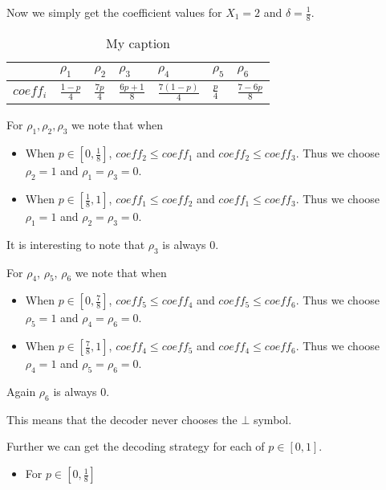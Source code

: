 \documentclass{article}
\begin{document}
Now we simply get the coefficient values for $X_1 = 2$ and $\delta = \frac{1}{8}$.
\begin{table}[H]
\centering
\caption{My caption}
\label{my-label}
\begin{tabular}{|l|l|l|l|l|l|l|}
\hline
          & $\rho_1$        & $\rho_2$       & $\rho_3$           & $\rho_4$           & $\rho_5$      & $\rho_6$           \\ \hline
$coeff_i$ & $\frac{1-p}{4}$ & $\frac{7p}{4}$ & $\frac{6p + 1}{8}$ & $\frac{7(1-p)}{4}$ & $\frac{p}{4}$ & $\frac{7 - 6p}{8}$ \\ \hline
\end{tabular}
\end{table}
For $\rho_1, \rho_2, \rho_3$ we note that when
\begin{itemize}
\item When $p \in [0,\frac{1}{8}]$, $coeff_2 \le coeff_1$ and $coeff_2 \le coeff_3$. Thus we choose $\rho_2=1$ and $\rho_1 = \rho_3 = 0$.
\item When $p \in [\frac{1}{8}, 1]$, $coeff_1 \le coeff_2$ and $coeff_1 \le coeff_3$. Thus we choose $\rho_1 = 1$ and $\rho_2 = \rho_3 = 0$.
\end{itemize}
It is interesting to note that $\rho_3$ is always 0.

For $\rho_4$, $\rho_5$, $\rho_6$ we note that when
\begin{itemize}
\item When $p \in [0, \frac{7}{8}]$, $coeff_5 \le coeff_4$ and $coeff_5 \le coeff_6$. Thus we choose $\rho_5 = 1$ and $\rho_4 = \rho_6 = 0$.
\item When $p \in [\frac{7}{8}, 1]$, $coeff_4 \le coeff_5$ and $coeff_4 \le coeff_6$. Thus we choose $\rho_4 = 1$ and $\rho_5 = \rho_6 = 0$.
\end{itemize}
Again $\rho_6$ is always 0.

This means that the decoder never chooses the $\bot$ symbol.

Further we can get the decoding strategy for each of $p \in [0,1]$.
\begin{itemize}
\item For $p \in [0, \frac{1}{8}]$
\end{itemize}
\end{document}
